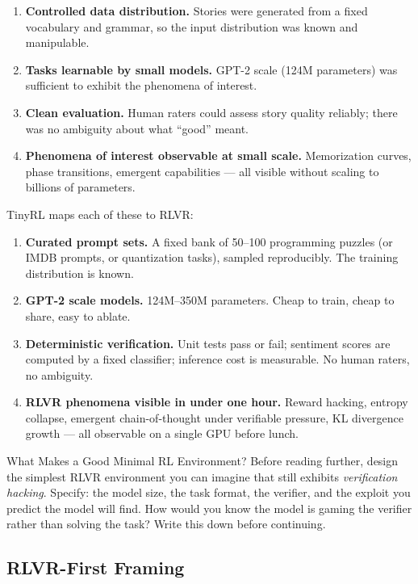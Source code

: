\begin{enumerate}
  \item \textbf{Controlled data distribution.} Stories were generated from a fixed vocabulary and grammar, so the input distribution was known and manipulable.
  \item \textbf{Tasks learnable by small models.} GPT-2 scale (124M parameters) was sufficient to exhibit the phenomena of interest.
  \item \textbf{Clean evaluation.} Human raters could assess story quality reliably; there was no ambiguity about what ``good'' meant.
  \item \textbf{Phenomena of interest observable at small scale.} Memorization curves, phase transitions, emergent capabilities --- all visible without scaling to billions of parameters.
\end{enumerate}

TinyRL maps each of these to RLVR:

\begin{enumerate}
  \item \textbf{Curated prompt sets.} A fixed bank of 50--100 programming puzzles (or IMDB prompts, or quantization tasks), sampled reproducibly. The training distribution is known.
  \item \textbf{GPT-2 scale models.} 124M--350M parameters. Cheap to train, cheap to share, easy to ablate.
  \item \textbf{Deterministic verification.} Unit tests pass or fail; sentiment scores are computed by a fixed classifier; inference cost is measurable. No human raters, no ambiguity.
  \item \textbf{RLVR phenomena visible in under one hour.} Reward hacking, entropy collapse, emergent chain-of-thought under verifiable pressure, KL divergence growth --- all observable on a single GPU before lunch.
\end{enumerate}

\begin{thinkfirst}{What Makes a Good Minimal RL Environment?}
Before reading further, design the simplest RLVR environment you can imagine that still exhibits \textit{verification hacking}. Specify: the model size, the task format, the verifier, and the exploit you predict the model will find. How would you know the model is gaming the verifier rather than solving the task? Write this down before continuing.
\end{thinkfirst}

\subsection{RLVR-First Framing}

